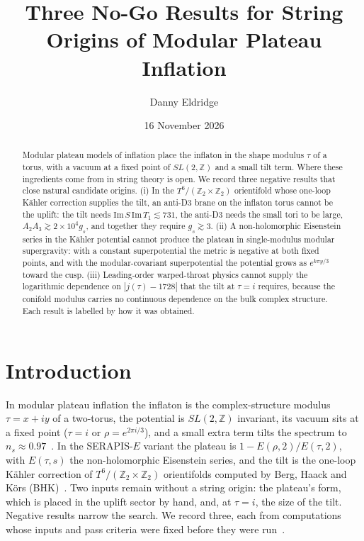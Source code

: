 \documentclass[aps,prd,twocolumn,superscriptaddress,nofootinbib,showkeys]{revtex4-2}
\begin{document}
\title{Three No-Go Results for String Origins of Modular Plateau Inflation}
\author{Danny Eldridge}
\date{16 November 2026}
\begin{abstract}
Modular plateau models of inflation place the inflaton in the shape modulus $\tau$ of a torus, with a vacuum at a fixed point of $SL(2,\mathbb{Z})$ and a small tilt term. Where these ingredients come from in string theory is open. We record three negative results that close natural candidate origins. (i) In the $T^6/(\mathbb{Z}_2\times\mathbb{Z}_2)$ orientifold whose one-loop K\"ahler correction supplies the tilt, an anti-D3 brane on the inflaton torus cannot be the uplift: the tilt needs $\mathrm{Im}\,S\,\mathrm{Im}\,T_1\lesssim731$, the anti-D3 needs the small tori to be large, $A_2A_3\gtrsim2\times10^4g_s$, and together they require $g_s\gtrsim3$. (ii) A non-holomorphic Eisenstein series in the K\"ahler potential cannot produce the plateau in single-modulus modular supergravity: with a constant superpotential the metric is negative at both fixed points, and with the modular-covariant superpotential the potential grows as $e^{k\pi y/3}$ toward the cusp. (iii) Leading-order warped-throat physics cannot supply the logarithmic dependence on $|j(\tau)-1728|$ that the tilt at $\tau=i$ requires, because the conifold modulus carries no continuous dependence on the bulk complex structure. Each result is labelled by how it was obtained.
\end{abstract}
\maketitle

\section{Introduction}
In modular plateau inflation the inflaton is the complex-structure modulus $\tau=x+iy$ of a two-torus, the potential is $SL(2,\mathbb{Z})$ invariant, its vacuum sits at a fixed point ($\tau=i$ or $\rho=e^{2\pi i/3}$), and a small extra term tilts the spectrum to $n_s\approx0.97$~\cite{SERAPIS,KLsl2z}. In the SERAPIS-$E$ variant the plateau is $1-E(\rho,2)/E(\tau,2)$, with $E(\tau,s)$ the non-holomorphic Eisenstein series, and the tilt is the one-loop K\"ahler correction of $T^6/(\mathbb{Z}_2\times\mathbb{Z}_2)$ orientifolds computed by Berg, Haack and K\"ors (BHK)~\cite{BHK}. Two inputs remain without a string origin: the plateau's form, which is placed in the uplift sector by hand, and, at $\tau=i$, the size of the tilt. Negative results narrow the search. We record three, each from computations whose inputs and pass criteria were fixed before they were run~\cite{SERAPIS}.
\end{document}
